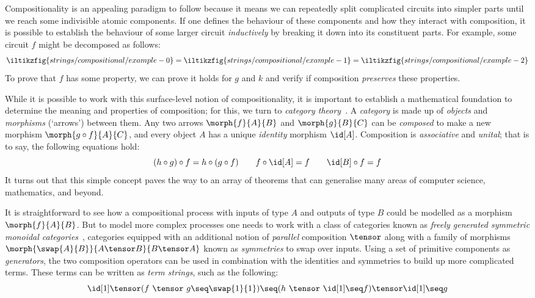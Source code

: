 Compositionality is an appealing paradigm to follow because it means we can
repeatedly split complicated circuits into simpler parts until we reach some
indivisible atomic components.
If one defines the behaviour of these components and how they interact
with composition, it is possible to establish the behaviour of some
larger circuit \emph{inductively} by breaking it down into its constituent
parts.
For example, some circuit \(f\) might be decomposed as follows:
\[
    \iltikzfig{strings/compositional/example-0}
    =
    \iltikzfig{strings/compositional/example-1}
    =
    \iltikzfig{strings/compositional/example-2}
\]
To prove that \(f\) has some property, we can prove it holds for \(g\) and \(k\)
and verify if composition \emph{preserves} these properties.

While it is possible to work with this surface-level notion of
compositionality, it is important to establish a mathematical
foundation to determine the meaning and properties of composition; for this, we
turn to \emph{category theory}~\cite{maclane1978categories}.
A \emph{category} is made up of \emph{objects} and \emph{morphisms} (`arrows')
between them.
Any two arrows \(\morph{f}{A}{B}\) and \(\morph{g}{B}{C}\) can be
\emph{composed} to  make a new morphism \(\morph{g \circ f}{A}{C}\), and every
object \(A\) has a unique \emph{identity} morphism \(\id[A]\).
Composition is \emph{associative} and \emph{unital}; that is to say, the
following equations hold:
\[
    (h \circ g) \circ f = h \circ (g \circ f)
    \qquad
    f \circ \id[A] = f
    \qquad
    \id[B] \circ f = f
\]
It turns out that this simple concept paves the way to an array of
theorems that can generalise many areas of computer science, mathematics, and
beyond.

It is straightforward to see how a compositional process with inputs of type
\(A\) and outputs of type \(B\) could be modelled as a morphism
\(\morph{f}{A}{B}\).
But to model more complex processes one needs to work with a class of categories
known as
\emph{freely generated symmetric monoidal categories}~\cite{maclane1963natural},
categories equipped with an additional notion of \emph{parallel} composition
\(\tensor\) along with a family of morphisms
\(\morph{\swap{A}{B}}{A\tensor B}{B \tensor A}\) known as \emph{symmetries} to
swap over inputs.
Using a set of primitive components as \emph{generators}, the two composition
operators can be used in combination with the identities and symmetries to build
up more complicated terms.
These terms can be written as \emph{term strings}, such as the following:
\[
    \id[1]
    \tensor
    (f\ \tensor\ g
    \seq
    \swap{1}{1}
    )
    \seq
    (h\ \tensor\ \id[1] \seq f)
    \tensor
    \id[1]
    \seq
    g
\]

